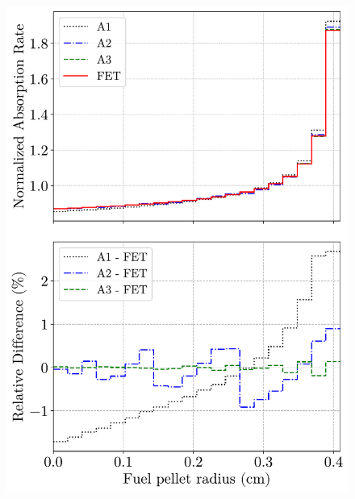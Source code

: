 \begin{figure}
    \centering
    \begin{minipage}{.49\textwidth}
      \centering
      \includegraphics[width=\textwidth]{figs/pin_2d_abs.pdf}
    \end{minipage}%
    \begin{minipage}{.51\textwidth}
      \centering

\end{minipage}
\end{figure}
